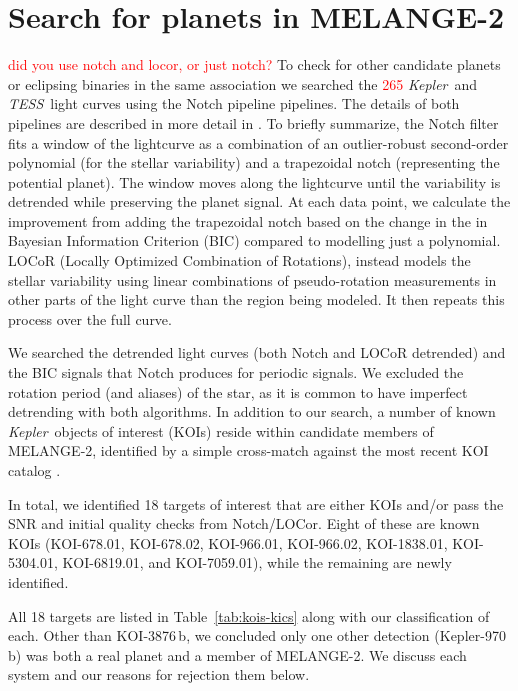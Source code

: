 \documentclass[twocolumn]{aastex631}
\newcommand{\planetname}{KOI-3876\,b}
\newcommand{\kepler}{{\it Kepler}}
\newcommand{\tess}{\textit{TESS}}
\newcommand{\association}{MELANGE-2}
\begin{document}
\section{Search for planets in MELANGE-2}\label{sec:search}

\textcolor{red}{did you use notch and locor, or just notch?}
To check for other candidate planets or eclipsing binaries in the same association we searched the \textcolor{red}{265} \kepler\ and \tess\ light curves using the Notch pipeline pipelines. The details of both pipelines are described in more detail in \citet{Rizzuto2017}. To briefly summarize, the Notch filter fits a window of the lightcurve as a combination of an outlier-robust second-order polynomial (for the stellar variability) and a trapezoidal notch (representing the potential planet). The window moves along the lightcurve until the variability is detrended while preserving the planet signal. At each data point, we calculate the improvement from adding the trapezoidal notch based on the change in the in Bayesian Information Criterion (BIC) compared to modelling just a polynomial. LOCoR (Locally Optimized Combination of Rotations), instead models the stellar variability using linear combinations of pseudo-rotation measurements in other parts of the light curve than the region being modeled. It then repeats this process over the full curve. 

We searched the detrended light curves (both Notch and LOCoR detrended) and the BIC signals that Notch produces for periodic signals. We excluded the rotation period (and aliases) of the star, as it is common to have imperfect detrending with both algorithms. In addition to our search, a number of known \kepler\ objects of interest (KOIs) reside within candidate members of \association, identified by a simple cross-match against the most recent KOI catalog \citep{2016AJ....152..158T}. 

In total, we identified 18 targets of interest that are either KOIs and/or pass the SNR and initial quality checks from Notch/LOCor. Eight of these are known KOIs (KOI-678.01, KOI-678.02, KOI-966.01, KOI-966.02, KOI-1838.01, KOI-5304.01, KOI-6819.01, and KOI-7059.01), while the remaining are newly identified. 

All 18 targets are listed in Table~\ref{tab:kois-kics} along with our classification of each. Other than \planetname, we concluded only one other detection (Kepler-970\,b) was both a real planet and a member of \association. We discuss each system and our reasons for rejection them below.
\end{document}
